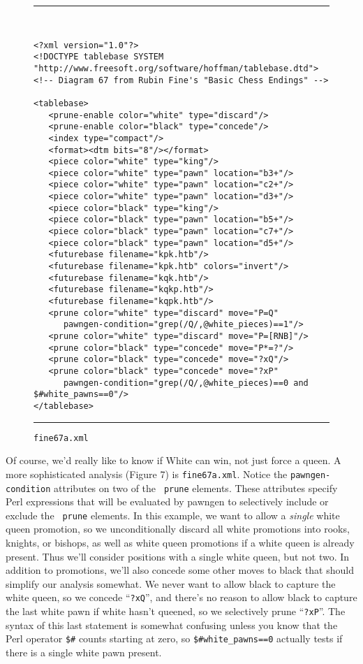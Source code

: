 \documentclass[11pt]{article}
\begin{document}
\begin{figure}
\hrule\ 
{\small\begin{verbatim}
<?xml version="1.0"?>
<!DOCTYPE tablebase SYSTEM "http://www.freesoft.org/software/hoffman/tablebase.dtd">
<!-- Diagram 67 from Rubin Fine's "Basic Chess Endings" -->

<tablebase>
   <prune-enable color="white" type="discard"/>
   <prune-enable color="black" type="concede"/>
   <index type="compact"/>
   <format><dtm bits="8"/></format>
   <piece color="white" type="king"/>
   <piece color="white" type="pawn" location="b3+"/>
   <piece color="white" type="pawn" location="c2+"/>
   <piece color="white" type="pawn" location="d3+"/>
   <piece color="black" type="king"/>
   <piece color="black" type="pawn" location="b5+"/>
   <piece color="black" type="pawn" location="c7+"/>
   <piece color="black" type="pawn" location="d5+"/>
   <futurebase filename="kpk.htb"/>
   <futurebase filename="kpk.htb" colors="invert"/>
   <futurebase filename="kqk.htb"/>
   <futurebase filename="kqkp.htb"/>
   <futurebase filename="kqpk.htb"/>
   <prune color="white" type="discard" move="P=Q"
      pawngen-condition="grep(/Q/,@white_pieces)==1"/>
   <prune color="white" type="discard" move="P=[RNB]"/>
   <prune color="black" type="concede" move="P*=?"/>
   <prune color="black" type="concede" move="?xQ"/>
   <prune color="black" type="concede" move="?xP"
      pawngen-condition="grep(/Q/,@white_pieces)==0 and $#white_pawns==0"/>
</tablebase>
\end{verbatim}}
\hrule
\caption{\tt fine67a.xml}
\end{figure}

Of course, we'd really like to know if White can win, not just force a
queen.  A more sophisticated analysis (Figure 7) is {\tt fine67a.xml}.
Notice the {\tt pawngen-condition} attributes on two of the {\tt
prune} elements.  These attributes specify Perl expressions that will
be evaluated by pawngen to selectively include or exclude the {\tt
prune} elements.  In this example, we want to allow a {\it single}
white queen promotion, so we unconditionally discard all white
promotions into rooks, knights, or bishops, as well as white queen
promotions if a white queen is already present.  Thus we'll consider
positions with a single white queen, but not two.  In addition to
promotions, we'll also concede some other moves to black that should
simplify our analysis somewhat.  We never want to allow black to
capture the white queen, so we concede ``{\tt ?xQ}'', and there's no
reason to allow black to capture the last white pawn if white hasn't
queened, so we selectively prune ``{\tt ?xP}''.  The syntax of this
last statement is somewhat confusing unless you know that the Perl
operator {\tt \$\#} counts starting at zero, so {\tt \$\#white\_pawns==0}
actually tests if there is a single white pawn present.
\end{document}
